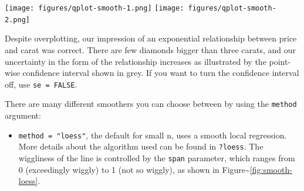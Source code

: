 \begin{Shaded}
\begin{Highlighting}[]
  \NormalTok{(}\NormalTok{, }\NormalTok{))}
  \NormalTok{(}\NormalTok{, }\NormalTok{))}
\end{Highlighting}
\end{Shaded}

\texttt{[image: figures/qplot-smooth-1.png]}
\texttt{[image: figures/qplot-smooth-2.png]}

Despite overplotting, our impression of an exponential relationship
between price and carat was correct. There are few diamonds bigger than
three carats, and our uncertainty in the form of the relationship
increases as illustrated by the point-wise confidence interval shown in
grey. If you want to turn the confidence interval off, use
\texttt{se = FALSE}.

There are many different smoothers you can choose between by using the
\texttt{method} argument:

\begin{itemize}
\itemsep1pt\parskip0pt
\item
  \texttt{method = "loess"}, the default for small n, uses a smooth
  local regression. More details about the algorithm used can be found
  in \texttt{?loess}. The wiggliness of the line is controlled by the
  \texttt{span} parameter, which ranges from 0 (exceedingly wiggly) to 1
  (not so wiggly), as shown in
  Figure\textasciitilde{}\ref{fig:smooth-loess}. 
\end{itemize}

\begin{Shaded}
\begin{Highlighting}[]
  \NormalTok{(}\NormalTok{, }\NormalTok{), }
   \NormalTok{)}
  \NormalTok{(}\NormalTok{, }\NormalTok{), }
   \NormalTok{)}
\end{Highlighting}
\end{Shaded}

